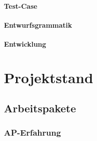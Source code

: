 \documentclass[type=zwischenbericht]{zukunftbau}
\begin{document}
\paragraph{Test-Case}
\begin{SemioNest}
\paragraph{Entwurfsgrammatik}
\paragraph{Entwicklung}
\end{SemioNest}

\section{Projektstand}

\subsection{Arbeitspakete}

\subsubsection{AP-Erfahrung}
\end{document}
